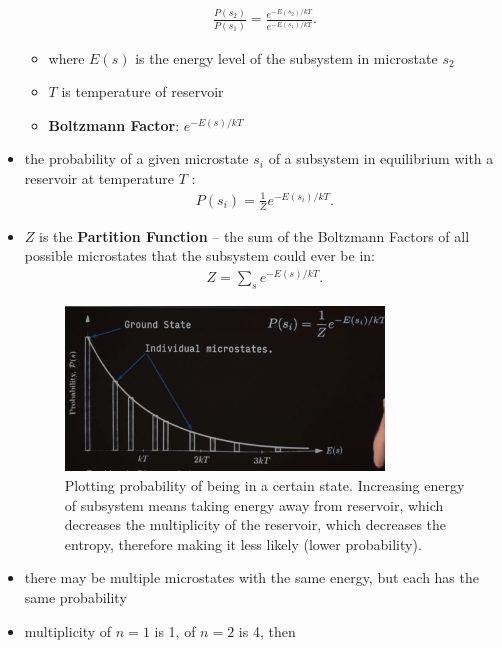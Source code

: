 \documentclass[10pt]{article}
\begin{document}
\begin{itemize}
        \begin{gather*}
            \frac{P(s_2)}{P(s_1)} = \frac{e^{-E(s_2) / kT}}{e^{-E(s_1) / kT}}
        .\end{gather*}
        \begin{itemize}
            \item where  $E(s)$ is the energy level of the subsystem in microstate $s_2$ 
            \item $T$ is temperature of reservoir 
            \item \textbf{Boltzmann Factor}: $e^{-E(s) / kT}$
        \end{itemize}
    \item the probability of a given microstate $s_i$ of a subsystem in equilibrium with a reservoir at temperature $T$ :
        \begin{gather*}
            P(s_i) = \frac{1}{Z} e^{-E(s_i) / kT}
        .\end{gather*}
    \item $Z$ is the \textbf{Partition Function} -- the sum of the Boltzmann Factors of all possible microstates that the subsystem could ever be in: 
        \begin{gather*}
            Z = \sum_{s} e^{-E(s) / kT}
        .\end{gather*}
        \begin{figure}[H]
            \centering
            \includegraphics[width=0.8\textwidth]{partitionFunction}
            \caption{Plotting probability of being in a certain state. Increasing energy of subsystem means taking energy away from reservoir, which decreases the multiplicity of the reservoir, which decreases the entropy, therefore making it less likely (lower probability).}
            \label{fig:partitionFunction}
        \end{figure}
    \item there may be multiple microstates with the same energy, but each has the same probability
    \item multiplicity of $n=1$ is 1, of $n=2$ is 4, then

\end{itemize}
\end{document}
